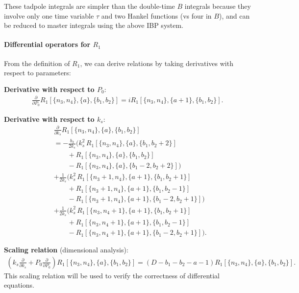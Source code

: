 \documentclass[a4paper,12pt]{article}
\newcommand{\n}{\nonumber}
\begin{document}
These tadpole integrals are simpler than the double-time $B$ integrals because they involve only one time variable $\tau$ and two Hankel functions (vs four in $B$), and can be reduced to master integrals using the above IBP system.



\paragraph{Differential operators for $R_1$}
From the definition of $R_1$, we can derive relations by taking derivatives with respect to parameters:

\textbf{Derivative with respect to $P_0$}:
\begin{align}
	\frac{\partial}{\partial P_0} R_1[\{n_3,n_4\},\{a\},\{b_1,b_2\}] = i R_1[\{n_3,n_4\},\{a+1\},\{b_1,b_2\}]. \label{eq:R1dP0}
\end{align}

\textbf{Derivative with respect to $k_s$}:
\begin{align}
	&\frac{\partial}{\partial k_s} R_1[\{n_3,n_4\},\{a\},\{b_1,b_2\}] \n\\
	&=-\frac{b_2}{2k_s}\Big(
	k_s^2\,R_1[\{n_3,n_4\},\{a\},\{b_1,b_2+2\}] \nonumber\\
	&\qquad
	+R_1[\{n_3,n_4\},\{a\},\{b_1,b_2\}] \nonumber\\
	&\qquad
	-R_1[\{n_3,n_4\},\{a\},\{b_1-2,b_2+2\}]
	\Big) \nonumber\\
	&+\frac{1}{2k_s}\Big(
	k_s^2\,R_1[\{n_3+1,n_4\},\{a+1\},\{b_1,b_2+1\}] \nonumber\\
	&\qquad
	+R_1[\{n_3+1,n_4\},\{a+1\},\{b_1,b_2-1\}] \nonumber\\
	&\qquad
	-R_1[\{n_3+1,n_4\},\{a+1\},\{b_1-2,b_2+1\}]
	\Big) \nonumber\\
	&+\frac{1}{2k_s}\Big(
	k_s^2\,R_1[\{n_3,n_4+1\},\{a+1\},\{b_1,b_2+1\}] \nonumber\\
	&\qquad
	+R_1[\{n_3,n_4+1\},\{a+1\},\{b_1,b_2-1\}] \nonumber\\
	&\qquad
	-R_1[\{n_3,n_4+1\},\{a+1\},\{b_1-2,b_2+1\}]
	\Big). \label{eq:R1dks}
\end{align}

\textbf{Scaling relation} (dimensional analysis):
\begin{align}
	\left( k_s \frac{\partial}{\partial k_s} + P_0 \frac{\partial}{\partial P_0} \right) R_1[\{n_3,n_4\},\{a\},\{b_1,b_2\}] = (D - b_1 - b_2 - a - 1) R_1[\{n_3,n_4\},\{a\},\{b_1,b_2\}]. \label{eq:R1scaling}
\end{align}
This scaling relation will be used to verify the correctness of differential equations.
\end{document}
